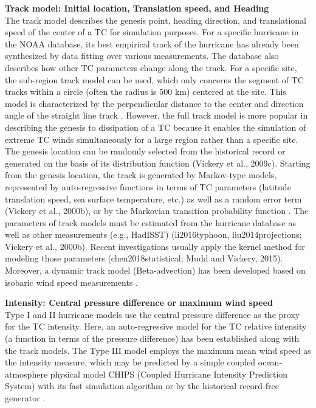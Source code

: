 \noindent\textbf{Track model: Initial location, Translation speed, and Heading} \\The track model describes the genesis point, heading direction, and translational speed of the center of a TC for simulation purposes. For a specific hurricane in the NOAA database, its best empirical track of the hurricane has already been synthesized by data fitting over various measurements. The database also describes how other TC parameters change along the track. For a specific site, the sub-region track model can be used, which only concerns the segment of TC tracks within a circle (often the radius is 500 km) centered at the site. This model is characterized by the perpendicular distance to the center and direction angle of the straight line track \citep{georgiou1986design, xiao2011typhoon}. However, the full track model is more popular in describing the genesis to dissipation of a TC because it enables the simulation of extreme TC winds simultaneously for a large region rather than a specific site. The genesis location can be randomly selected from the historical record or generated on the basis of its distribution function (Vickery et al., 2009c). Starting from the genesis location, the track is generated by Markov-type models, represented by auto-regressive functions in terms of TC parameters (latitude translation speed, sea surface temperature, etc.) as well as a random error term (Vickery et al., 2000b), or by the Markovian transition probability function \citep{emanuel2006statistical}. The parameters of track models must be estimated from the hurricane database as well as other measurements (e.g., HadISST) (li2016typhoon, liu2014projections; Vickery et al., 2000b). Recent investigations usually apply the kernel method for modeling those parameters (chen2018statistical; Mudd and Vickery, 2015). Moreover, a dynamic track model (Beta-advection) has been developed based on isobaric wind speed measurements \citep{emanuel2006statistical}. 
\newline

\noindent\textbf{Intensity: Central pressure difference or maximum wind speed} \\Type I and II hurricane models use the central pressure difference as the proxy for the TC intensity. Here, an auto-regressive model for the TC relative intensity (a function in terms of the pressure difference) has been established along with the track models. The Type III model employs the maximum mean wind speed as the intensity measure, which may be predicted by a simple coupled ocean-atmosphere physical model CHIPS (Coupled Hurricane Intensity Prediction System) with its fast simulation algorithm \citep{emanuel2011selfstratification,emanuel2017fast,emanuel2004environmental} or by the historical record-free generator \citep{emanuel2008hurricanes}. 
\newline

